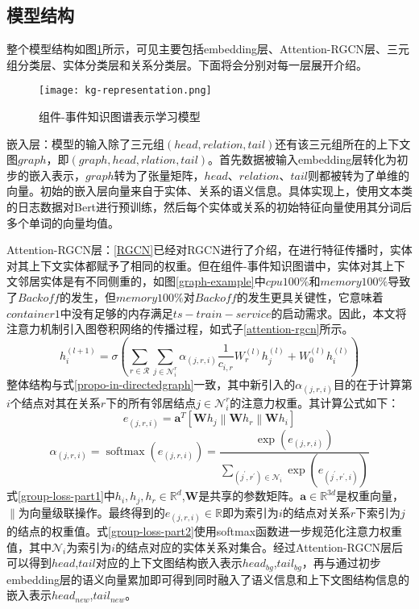 \subsection{模型结构}
整个模型结构如图\ref{kg-representation}所示，可见主要包括embedding层、Attention-RGCN层、三元组分类层、实体分类层和关系分类层。下面将会分别对每一层展开介绍。
\begin{figure}[htbp]
    \centering
    \texttt{[image: kg-representation.png]}
    \caption{组件-事件知识图谱表示学习模型\label{kg-representation}}
\end{figure}

嵌入层：模型的输入除了三元组$(head, relation, tail)$还有该三元组所在的上下文图$graph$，即$(graph, head,rlation,tail)$。首先数据被输入embedding层转化为初步的嵌入表示，$graph$转为了张量矩阵，$head$、$relation$、$tail$则都被转为了单维的向量。初始的嵌入层向量来自于实体、关系的语义信息。具体实现上，使用文本类的日志数据对Bert\cite{devlin2018bert}进行预训练，然后每个实体或关系的初始特征向量使用其分词后多个单词的向量均值。

Attention-RGCN层：\ref{RGCN}已经对RGCN进行了介绍，在进行特征传播时，实体对其上下文实体都赋予了相同的权重。但在组件-事件知识图谱中，实体对其上下文邻居实体是有不同侧重的，如图\ref{graph-example}中$cpu 100\%$和$memory 100\%$导致了$Backoff$的发生，但$memory 100\%$对$Backoff$的发生更具关键性，它意味着$container1$中没有足够的内存满足$ts-train-service$的启动需求。因此，本文将注意力机制引入图卷积网络的传播过程，如式子\ref{attention-rgcn}所示。
\begin{equation}
    h_{i}^{(l+1)}=\sigma\left(\sum_{r \in \mathcal{R}} \sum_{j \in \mathcal{N}_{i}^{r}} \alpha_{(j, r, i)} \frac{1}{c_{i, r}} W_{r}^{(l)} h_{j}^{(l)}+W_{0}^{(l)} h_{i}^{(l)}\right)
    \label{attention-rgcn}
\end{equation}
整体结构与式\ref{propo-in-directedgraph}一致，其中新引入的$\alpha_{(j, r, i)}$目的在于计算第$i$个结点对其在关系$r$下的所有邻居结点$j \in \mathcal{N}_{i}^{r}$的注意力权重。其计算公式如下：
\begin{equation}
    e_{(j, r, i)}=\mathbf{a}^{T}\left[\mathbf{W} h_{j}\left\|\mathbf{W} h_{r}\right\| \mathbf{W} h_{i}\right]
    \label{group-loss-part1}
\end{equation}
\begin{equation}
    \alpha_{(j, r, i)}=\operatorname{softmax}\left(e_{(j, r, i)}\right)=\frac{\exp \left(e_{(j, r, i)}\right)}{\sum_{\left(j^{\prime}, r^{\prime}\right) \in \mathcal{N}_{i}} \exp \left(e_{\left(j^{\prime}, r^{\prime}, i\right)}\right)}
    \label{group-loss-part2}
\end{equation}
式\ref{group-loss-part1}中$h_i,h_j,h_r\in\mathbb{R}^{d}$,$\mathbf{W}$是共享的参数矩阵。$\mathbf{a} \in \mathbb{R}^{3 d}$是权重向量，$\|$为向量级联操作。最终得到的$ e_{(j, r, i)} \in \mathbb{R}$即为索引为$i$的结点对关系$r$下索引为$j$的结点的权重值。式\ref{group-loss-part2}使用softmax函数进一步规范化注意力权重值，其中$\mathcal{N}_{i}$为索引为$i$的结点对应的实体关系对集合。经过Attention-RGCN层后可以得到$head$,$tail$对应的上下文图结构嵌入表示$head_{bg}$,$tail_{bg}$，再与通过初步embedding层的语义向量累加即可得到同时融入了语义信息和上下文图结构信息的嵌入表示$head_{new}$,$tail_{new}$。

